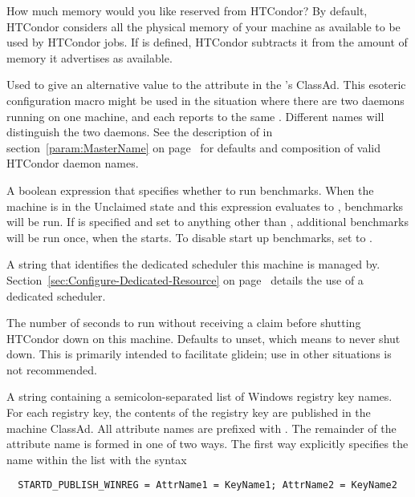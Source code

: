 \begin{description}
\label{param:ReservedMemory}
\item[\Macro{RESERVED\_MEMORY}]
  How much memory would you like reserved from HTCondor?  By default,
  HTCondor considers all the physical memory of your machine as
  available to be used by HTCondor jobs.  If  is
  defined, HTCondor subtracts it from the amount of memory it advertises
  as available.

\label{param:StartdName}
\item[\Macro{STARTD\_NAME}]
  Used to give an alternative value to the  attribute
  in the 's ClassAd.
  This esoteric configuration macro might be used in the situation
  where there are two  daemons running on one machine,
  and each reports to the same .
  Different names will distinguish the two daemons.
  See the description of  in
  section~\ref{param:MasterName} on page~\pageref{param:MasterName}
  for defaults and composition of valid HTCondor daemon names.

\label{param:RunBenchmarks}
\item[\Macro{RUNBENCHMARKS}]
  A boolean expression that specifies whether to run benchmarks.
  When the machine is in the Unclaimed state and this expression
  evaluates to , benchmarks will be run.
  If  is specified and set to anything other 
  than ,
  additional benchmarks will be run once,
  when the  starts.
  To disable start up benchmarks, set  to .

\label{param:DedicatedScheduler}
\item[\Macro{DedicatedScheduler}]
  A string that identifies the dedicated scheduler this machine is managed by.
  Section~\ref{sec:Configure-Dedicated-Resource}
  on page~\pageref{sec:Configure-Dedicated-Resource} details the use of
  a dedicated scheduler.

\label{param:StartdNoclaimShutdown}
\item[\Macro{STARTD\_NOCLAIM\_SHUTDOWN}]
  The number of seconds to run without receiving a claim before
  shutting HTCondor down on this machine.  Defaults to unset, which
  means to never shut down.  
  This is primarily intended to facilitate glidein;
  use in other situations is not recommended.

\label{param:StartdPublishWinreg}
\item[\Macro{STARTD\_PUBLISH\_WINREG}]
  A string containing a semicolon-separated list of Windows registry key names.
  For each registry key, the contents of the registry key are published in
  the machine ClassAd.
  All attribute names are prefixed with . 
  The remainder of the attribute name is formed in one of two ways.
  The first way explicitly specifies the name within the list with the
  syntax
\begin{verbatim}
  STARTD_PUBLISH_WINREG = AttrName1 = KeyName1; AttrName2 = KeyName2
\end{verbatim}


\end{description}
